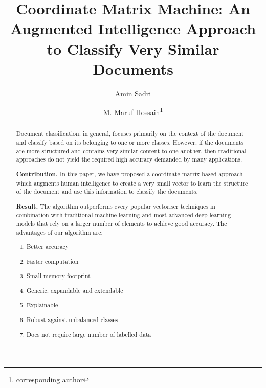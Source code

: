 \documentclass[runningheads]{llncs}
\begin{document}
%
\title{Coordinate Matrix Machine: An Augmented Intelligence Approach to Classify Very Similar Documents}
%
%
\author{Amin Sadri \and
M. Maruf Hossain\thanks{corresponding author}}
%
%
%
\maketitle              %
%
\begin{abstract}
Document classification, in general, focuses primarily on the context of the document and classify based on its belonging to one or more classes. However, if the documents are more structured and contains very similar content to one another, then traditional approaches do not yield the required high accuracy demanded by many applications.

\textbf{Contribution.} In this paper, we have proposed a coordinate matrix-based approach which augments human intelligence to create a very small vector to learn the structure of the document and use this information to classify the documents.

\textbf{Result.} The algorithm outperforms every popular vectoriser techniques in combination with traditional machine learning and most advanced deep learning models that rely on a larger number of elements to achieve good accuracy. The advantages of our algorithm are:
\begin{enumerate}
\item Better accuracy
\item Faster computation
\item Small memory footprint
\item Generic, expandable and extendable
\item Explainable
\item Robust against unbalanced classes
\item Does not require large number of labelled data
\end{enumerate}

\end{abstract}


%
%
%
% 
% 
%

{}
\end{document}
